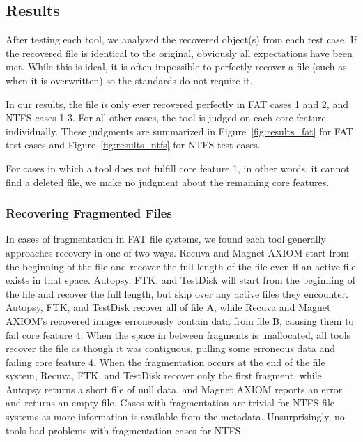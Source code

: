 \subsection{Results}

After testing each tool, we analyzed the recovered object(s) from each test case. 
If the recovered file is identical to the original, obviously all expectations have been met. 
While this is ideal, it is often impossible to perfectly recover a file (such as when it is overwritten) so the standards do not require it. 

In our results, the file is only ever recovered perfectly in FAT cases 1 and 2, and NTFS cases 1-3. 
For all other cases, the tool is judged on each core feature individually. 
These judgments are summarized in Figure~\ref{fig:results_fat} for FAT test cases and Figure~\ref{fig:results_ntfs} for NTFS test cases.

For cases in which a tool does not fulfill core feature 1, in other words, it cannot find a deleted file, we make no judgment about the remaining core features.

\subsubsection{Recovering Fragmented Files}
In cases of fragmentation in FAT file systems, we found each tool generally approaches recovery in one of two ways. 
Recuva and Magnet AXIOM start from the beginning of the file and recover the full length of the file even if an active file exists in that space. 
Autopsy, FTK, and TestDisk will start from the beginning of the file and recover the full length, but skip over any active files they encounter.
Autopsy, FTK, and TestDisk recover all of file A, while Recuva and Magnet AXIOM's recovered images erroneously contain data from file B, causing them to fail core feature 4. 
When the space in between fragments is unallocated, all tools recover the file as though it was contiguous, pulling some erroneous data and failing core feature 4. 
When the fragmentation occurs at the end of the file system, Recuva, FTK, and TestDisk recover only the first fragment, while Autopsy returns a short file of null data, and Magnet AXIOM reports an error and returns an empty file.
Cases with fragmentation are trivial for NTFS file systems as more information is available from the metadata. 
Unsurprisingly, no tools had problems with fragmentation cases for NTFS.

